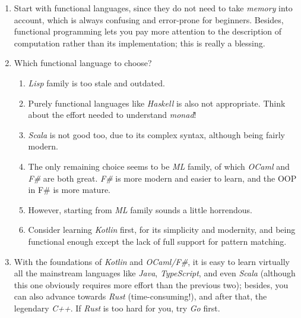 \documentclass{article}
\begin{document}
\begin{enumerate}
    \item Start with functional languages, since they do not need to take \emph{memory} into account, which is always confusing and error-prone for beginners.
    Besides, functional programming lets you pay more attention to the description of computation rather than its implementation; this is really a blessing.
    \item Which functional language to choose?
    \begin{enumerate}
        \item \emph{Lisp} family is too stale and outdated.
        \item Purely functional languages like \emph{Haskell} is also not appropriate.
        Think about the effort needed to understand \emph{monad}!
        \item \emph{Scala} is not good too, due to its complex syntax, although being fairly modern.
        \item The only remaining choice seems to be \emph{ML} family, of which \emph{OCaml} and \emph{F\#} are both great. \emph{F\#} is more modern and easier to learn, and the OOP in F\# is more mature.
        \item However, starting from \emph{ML} family sounds a little horrendous.
        \item Consider learning \emph{Kotlin} first, for its simplicity and modernity, and being functional enough except the lack of full support for pattern matching.
    \end{enumerate}
    \item With the foundations of \emph{Kotlin} and \emph{OCaml/F\#}, it is easy to learn virtually all the mainstream languages like \emph{Java}, \emph{TypeScript}, and even \emph{Scala} (although this one obviously requires more effort than the previous two); besides, you can also advance towards \emph{Rust} (time-consuming!), and after that, the legendary \emph{C++}.
    If \emph{Rust} is too hard for you, try \emph{Go} first.
\end{enumerate}
\end{document}
